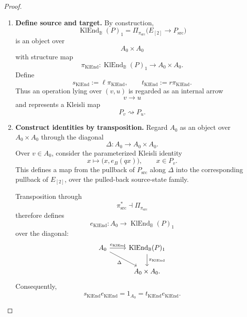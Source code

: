\begin{proof}
    \leavevmode
    \begin{enumerate}
        \item \textbf{Define source and target.}
        By construction,
        \[
            \operatorname{KlEnd}_{\mathbb B}(P)_1
            =
            \Pi_{\pi_{\mathrm{src}}}
            \bigl(
                E_{[2]}\to P_{\mathrm{src}}
            \bigr)
        \]
        is an object over
        \[
            A_0\times A_0
        \]
        with structure map
        \[
            \pi_{\operatorname{KlEnd}}:
            \operatorname{KlEnd}_{\mathbb B}(P)_1
            \to
            A_0\times A_0.
        \]
        Define
        \[
            s_{\operatorname{KlEnd}}
            :=
            \ell\pi_{\operatorname{KlEnd}},
            \qquad
            t_{\operatorname{KlEnd}}
            :=
            r\pi_{\operatorname{KlEnd}}.
        \]
        Thus an operation lying over \((v,u)\) is regarded as an internal
        arrow
        \[
            v\to u
        \]
        and represents a Kleisli map
        \[
            P_v\rightsquigarrow P_u.
        \]

        \item \textbf{Construct identities by transposition.}
        Regard \(A_0\) as an object over \(A_0\times A_0\) through the
        diagonal
        \[
            \Delta:A_0\to A_0\times A_0.
        \]
        Over \(v\in A_0\), consider the parameterized Kleisli identity
        \[
            x
            \longmapsto
            \bigl(
                x,e_B(qx)
            \bigr),
            \qquad
            x\in P_v.
        \]
        This defines a map from the pullback of \(P_{\mathrm{src}}\) along
        \(\Delta\) into the corresponding pullback of \(E_{[2]}\), over the
        pulled-back source-state family.

        Transposition through
        \[
            \pi_{\mathrm{src}}^*
            \dashv
            \Pi_{\pi_{\mathrm{src}}}
        \]
        therefore defines
        \[
            e_{\operatorname{KlEnd}}:
            A_0
            \to
            \operatorname{KlEnd}_{\mathbb B}(P)_1
        \]
        over the diagonal:
        \[
        \begin{tikzcd}
            A_0
                \arrow[r, "e_{\operatorname{KlEnd}}"]
                \arrow[dr, "\Delta"']
            &
            \operatorname{KlEnd}_{\mathbb B}(P)_1
                \arrow[d, "\pi_{\operatorname{KlEnd}}"]
            \\
            &
            A_0\times A_0.
        \end{tikzcd}
        \]
        Consequently,
        \[
            s_{\operatorname{KlEnd}}
            e_{\operatorname{KlEnd}}
            =
            1_{A_0}
            =
            t_{\operatorname{KlEnd}}
            e_{\operatorname{KlEnd}}.
        \]


\end{enumerate}
\end{proof}
